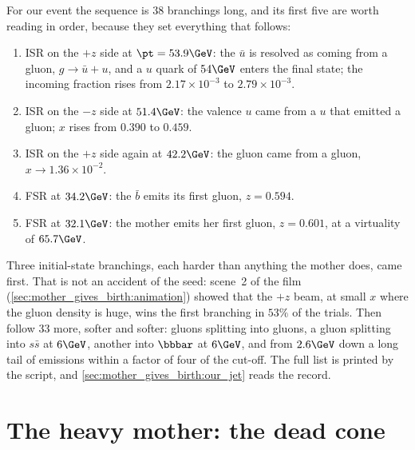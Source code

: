 For our event the sequence is 38 branchings long, and its first five are
worth reading in order, because they set everything that follows:
\begin{enumerate}[nosep]
  \item ISR on the $+z$ side at $\pt=53.9\GeV$: the $\bar u$ is resolved as
    coming from a gluon, $g\to\bar u+u$, and a $u$ quark of $54\GeV$ enters
    the final state; the incoming fraction rises from $2.17\times10^{-3}$ to
    $2.79\times10^{-3}$.
  \item ISR on the $-z$ side at $51.4\GeV$: the valence $u$ came from a $u$
    that emitted a gluon; $x$ rises from $0.390$ to $0.459$.
  \item ISR on the $+z$ side again at $42.2\GeV$: the gluon came from a
    gluon, $x\to1.36\times10^{-2}$.
  \item FSR at $34.2\GeV$: the $\bar b$ emits its first gluon, $z=0.594$.
  \item FSR at $32.1\GeV$: the mother emits her first gluon, $z=0.601$, at a
    virtuality of $65.7\GeV$.
\end{enumerate}
Three initial-state branchings, each harder than anything the mother does,
came first. That is not an accident of the seed: scene~2 of the film
(\cref{sec:mother_gives_birth:animation}) showed that the $+z$ beam, at small
$x$ where the gluon density is huge, wins the first branching in $53\%$ of
the trials. Then follow 33 more, softer and softer: gluons splitting into
gluons, a gluon splitting into $s\bar s$ at $6\GeV$, another into
$\bbbar$ at $6\GeV$, and from $2.6\GeV$ down a long tail of emissions
within a factor of four of the cut-off. The full list is printed by the
script, and \cref{sec:mother_gives_birth:our_jet} reads the record.

\section{The heavy mother: the dead cone}
\label{sec:mother_gives_birth:dead_cone}


